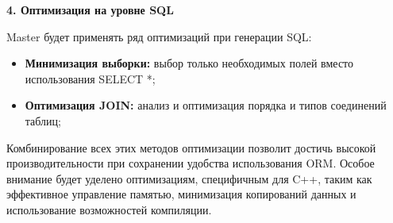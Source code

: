         \textbf{4. Оптимизация на уровне SQL}
        
            Master будет применять ряд оптимизаций при генерации SQL:
            
            \begin{itemize}
                \item \textbf{Минимизация выборки:} выбор только необходимых полей вместо использования SELECT *;
                
                \item \textbf{Оптимизация JOIN:} анализ и оптимизация порядка и типов соединений таблиц;
            \end{itemize}
            
        Комбинирование всех этих методов оптимизации позволит достичь высокой производительности при сохранении удобства использования ORM. Особое внимание будет уделено оптимизациям, специфичным для C++, таким как эффективное управление памятью, минимизация копирований данных и использование возможностей компиляции.
